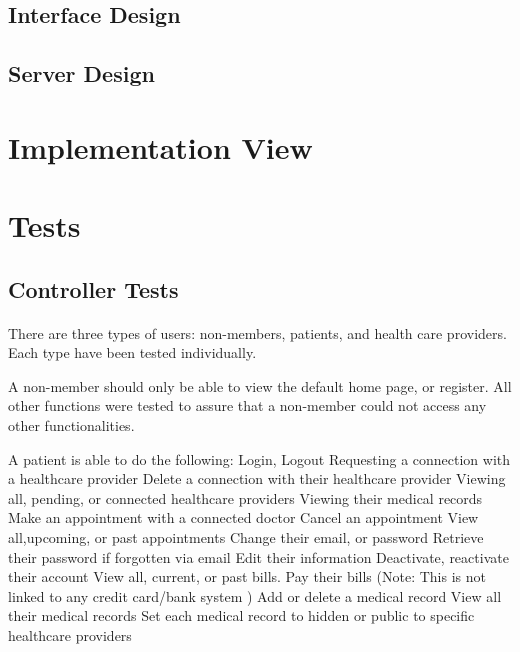 \documentclass[12pt]{report}
\begin{document}
\subsection{Interface Design}
\subsection{Server Design}

\section{Implementation View}

\section{Tests}

\subsection{Controller Tests}

\paragraph{} 
There are three types of users: non-members, patients, and health care providers. Each type have been tested individually.

A non-member should only be able to view the default home page, or register. All other functions were tested to assure that a non-member could not access any other functionalities. 

A patient is able to do the following:
\bullet Login, Logout
\bullet Requesting a connection with a healthcare provider
\bullet Delete a connection with their healthcare provider
\bullet Viewing all, pending, or connected healthcare providers
\bullet Viewing their medical records
\bullet Make an appointment with a connected doctor
\bullet Cancel an appointment 
\bullet View all,upcoming, or past appointments
\bullet Change their email, or password
\bullet Retrieve their password if forgotten via email
\bullet Edit their information
\bullet Deactivate, reactivate their account
\bullet View all, current, or past bills.
\bullet Pay their bills (Note: This is not linked to any credit card/bank system ) 
\bullet Add or delete a medical record
\bullet View all their medical records
\bullet Set each medical record to hidden or public to specific healthcare providers
\end{document}
